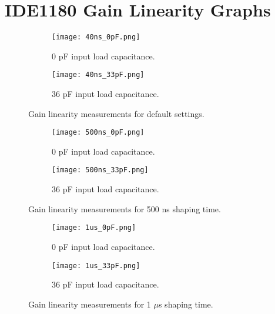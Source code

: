\documentclass[../main/thesis.tex]{subfiles}
\begin{document}
\chapter{IDE1180 Gain Linearity Graphs}
\label{a-gainlin}

\begin{figure} [h!]%
	\centering
	\begin{subfigure}{.5\textwidth}
		\centering
		\texttt{[image: 40ns\_0pF.png]}
		\caption{0 pF input load capacitance.}
		\label{fig-gainlin-40-0}
	\end{subfigure}%
	\begin{subfigure}{.5\textwidth}
		\centering
		\texttt{[image: 40ns\_33pF.png]}
		\caption{36 pF input load capacitance.}
		\label{fig-gainlin-40-33} 
	\end{subfigure}
	\caption{Gain linearity measurements for default settings.}
	\label{fig-gainlin-def}
\end{figure}

\begin{figure} [h!]%
	\centering
	\begin{subfigure}{.5\textwidth}
		\centering
		\texttt{[image: 500ns\_0pF.png]}
		\caption{0 pF input load capacitance.}
		\label{fig-gainlin-500-0}
	\end{subfigure}%
	\begin{subfigure}{.5\textwidth}
		\centering
		\texttt{[image: 500ns\_33pF.png]}
		\caption{36 pF input load capacitance.}
		\label{fig-gainlin-500-33} 
	\end{subfigure}
	\caption{Gain linearity measurements for 500 ns shaping time.}
	\label{fig-gainlin-500}
\end{figure}

\begin{figure} %
	\centering
	\begin{subfigure}{.5\textwidth}
		\centering
		\texttt{[image: 1us\_0pF.png]}
		\caption{0 pF input load capacitance.}
		\label{fig-gainlin-1-0}
	\end{subfigure}%
	\begin{subfigure}{.5\textwidth}
		\centering
		\texttt{[image: 1us\_33pF.png]}
		\caption{36 pF input load capacitance.}
		\label{fig-gainlin-1-33} 
	\end{subfigure}
	\caption{Gain linearity measurements for 1 $\mu$s shaping time.}
	\label{fig-gainlin-1}
\end{figure}
\end{document}

